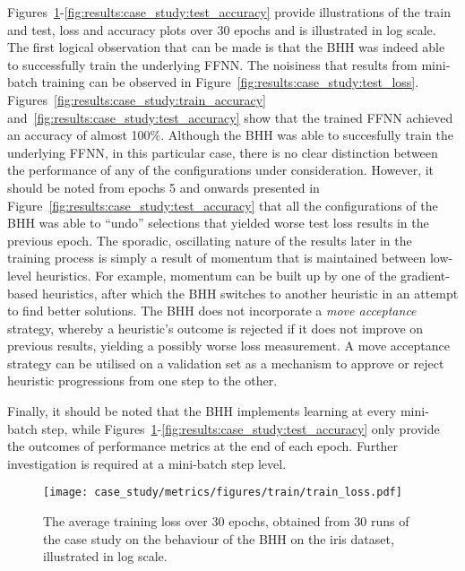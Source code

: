 Figures~\ref{fig:results:case_study:train_loss}-\ref{fig:results:case_study:test_accuracy} provide illustrations of the train and test, loss and accuracy plots over 30 epochs and is illustrated in log scale. The first logical observation that can be made is that the \acs{BHH} was indeed able to successfully train the underlying \acs{FFNN}. The noisiness that results from mini-batch training can be observed in Figure~\ref{fig:results:case_study:test_loss}. Figures~\ref{fig:results:case_study:train_accuracy} and~\ref{fig:results:case_study:test_accuracy} show that the trained \acs{FFNN} achieved an accuracy of almost 100\%. Although the \acs{BHH} was able to succesfully train the underlying \acs{FFNN}, in this particular case, there is no clear distinction between the performance of any of the configurations under consideration. However, it should be noted from epochs 5 and onwards presented in Figure~\ref{fig:results:case_study:test_accuracy} that all the configurations of the \acs{BHH} was able to ``undo'' selections that yielded worse test loss results in the previous epoch. The sporadic, oscillating nature of the results later in the training process is simply a result of momentum that is maintained between low-level heuristics. For example, momentum can be built up by one of the gradient-based heuristics, after which the \acs{BHH} switches to another heuristic in an attempt to find better solutions. The \acs{BHH} does not incorporate a \textit{move acceptance} strategy, whereby a heuristic's outcome is rejected if it does not improve on previous results, yielding a possibly worse loss measurement. A move acceptance strategy can be utilised on a validation set as a mechanism to approve or reject heuristic progressions from one step to the other.

Finally, it should be noted that the \acs{BHH} implements learning at every mini-batch step, while Figures~\ref{fig:results:case_study:train_loss}-\ref{fig:results:case_study:test_accuracy} only provide the outcomes of performance metrics at the end of each epoch. Further investigation is required at a mini-batch step level.

\begin{figure}[htpb]
	\centering
	\texttt{[image: case\_study/metrics/figures/train/train\_loss.pdf]}
	\caption{The average training loss over 30 epochs, obtained from 30 runs of the case study on the behaviour of the \acs{BHH} on the iris dataset, illustrated in log scale.}
	\label{fig:results:case_study:train_loss}
\end{figure}

